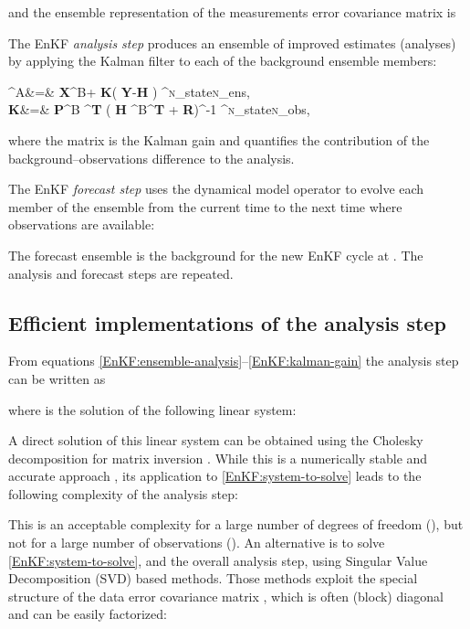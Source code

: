 \documentclass[12pt]{article}
\newcommand{\Nobs}{\textsc{n}_{{\rm obs}}}
\newcommand{\Nens}{\textsc{n}_{{\rm ens}}}
\newcommand{\Nstate}{\textsc{n}_{{\rm state}}}
\newcommand{\XA}{{\bf X}^{\rm A}}
\newcommand{\XB}{{\bf X}^{\rm B}}
\newcommand{\PB}{{\bf P}^{\rm B}}
\newcommand{\R}{{\bf R}}
\newcommand{\KAL}{{\bf K}}
\newcommand{\Y}{{\bf Y}}
\newcommand{\Lo}{{\bf H}}
\renewcommand{\Re}{\mathbbm{R}}
\begin{document}
and the ensemble representation of the measurements error covariance matrix is



The EnKF {\em analysis step} produces an ensemble of improved estimates (analyses)  by applying the Kalman filter
to each of the background ensemble members:
 
\label{EnKF:ensemble-analysis}
\displaystyle \XA &=& \XB + \KAL \cdot \left ( {{\Y}-{\Lo} \cdot  {\XB} } \right ) \in \Re^{\Nstate \times \Nens}, \\
\label{EnKF:kalman-gain}
\KAL &=& {\PB}  \cdot {\Lo}^{{\bf T}} \cdot \left ( {\Lo}  \cdot \PB \cdot {\Lo}^{{\bf T}} + \R \right )^{-1} \in \Re^{\Nstate \times \Nobs},

where the matrix  is the Kalman gain and quantifies the contribution of the background--observations difference to the analysis. 

The EnKF {\em forecast step} uses the dynamical model operator  to evolve each member of the ensemble 
 from the current time  to the next time  where observations are available:

The forecast ensemble  is the background for the new EnKF cycle at . The analysis and forecast steps are repeated.

\subsection{Efficient implementations of the analysis step}
\label{enkf-analysis}


From equations \eqref{EnKF:ensemble-analysis}--\eqref{EnKF:kalman-gain} the analysis step can be written as 

where  is the solution of the following linear system:

A direct solution of this linear system can be obtained using the Cholesky decomposition for matrix inversion \cite{Lin99,Sch90,Xia10}. 
While this is a numerically stable and accurate approach  \cite{Gill96,Mei83,Ste97}, its application to \eqref{EnKF:system-to-solve} leads to the following complexity \cite{Jan06} of the analysis step:

This is an acceptable complexity for a large number of degrees of freedom (), but not for a large number of observations (). An alternative is to solve \eqref{EnKF:system-to-solve}, and the overall analysis step, using Singular Value Decomposition (SVD) based methods. Those methods exploit the special structure of the data error covariance matrix , which is often (block) diagonal
and can be easily factorized:
\end{document}
